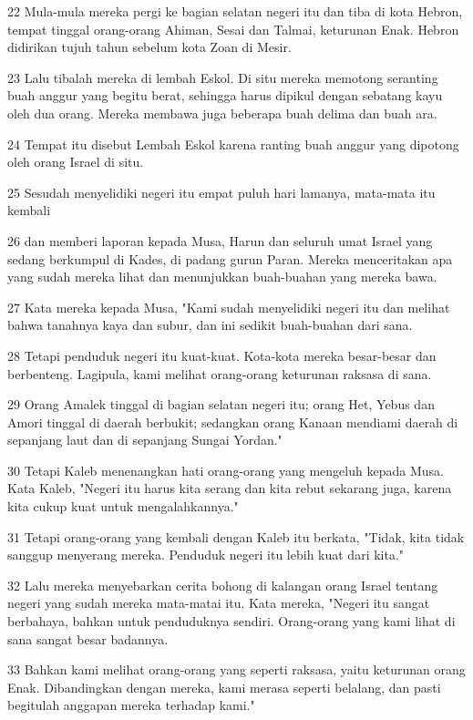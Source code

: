 \par 22 Mula-mula mereka pergi ke bagian selatan negeri itu dan tiba di kota Hebron, tempat tinggal orang-orang Ahiman, Sesai dan Talmai, keturunan Enak. Hebron didirikan tujuh tahun sebelum kota Zoan di Mesir.
\par 23 Lalu tibalah mereka di lembah Eskol. Di situ mereka memotong seranting buah anggur yang begitu berat, sehingga harus dipikul dengan sebatang kayu oleh dua orang. Mereka membawa juga beberapa buah delima dan buah ara.
\par 24 Tempat itu disebut Lembah Eskol karena ranting buah anggur yang dipotong oleh orang Israel di situ.
\par 25 Sesudah menyelidiki negeri itu empat puluh hari lamanya, mata-mata itu kembali
\par 26 dan memberi laporan kepada Musa, Harun dan seluruh umat Israel yang sedang berkumpul di Kades, di padang gurun Paran. Mereka menceritakan apa yang sudah mereka lihat dan menunjukkan buah-buahan yang mereka bawa.
\par 27 Kata mereka kepada Musa, "Kami sudah menyelidiki negeri itu dan melihat bahwa tanahnya kaya dan subur, dan ini sedikit buah-buahan dari sana.
\par 28 Tetapi penduduk negeri itu kuat-kuat. Kota-kota mereka besar-besar dan berbenteng. Lagipula, kami melihat orang-orang keturunan raksasa di sana.
\par 29 Orang Amalek tinggal di bagian selatan negeri itu; orang Het, Yebus dan Amori tinggal di daerah berbukit; sedangkan orang Kanaan mendiami daerah di sepanjang laut dan di sepanjang Sungai Yordan."
\par 30 Tetapi Kaleb menenangkan hati orang-orang yang mengeluh kepada Musa. Kata Kaleb, "Negeri itu harus kita serang dan kita rebut sekarang juga, karena kita cukup kuat untuk mengalahkannya."
\par 31 Tetapi orang-orang yang kembali dengan Kaleb itu berkata, "Tidak, kita tidak sanggup menyerang mereka. Penduduk negeri itu lebih kuat dari kita."
\par 32 Lalu mereka menyebarkan cerita bohong di kalangan orang Israel tentang negeri yang sudah mereka mata-matai itu. Kata mereka, "Negeri itu sangat berbahaya, bahkan untuk penduduknya sendiri. Orang-orang yang kami lihat di sana sangat besar badannya.
\par 33 Bahkan kami melihat orang-orang yang seperti raksasa, yaitu keturunan orang Enak. Dibandingkan dengan mereka, kami merasa seperti belalang, dan pasti begitulah anggapan mereka terhadap kami."

